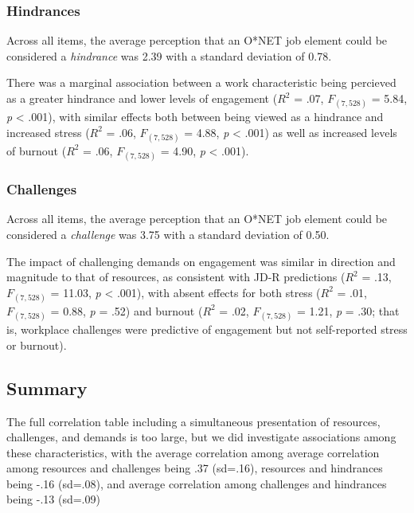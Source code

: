 \documentclass[
  english,
  man]{apa6}
\begin{document}
\hypertarget{hindrances}{%
\subsubsection{Hindrances}\label{hindrances}}

Across all items, the average perception that an O*NET job element could be considered a \emph{hindrance} was 2.39 with a standard deviation of 0.78.

There was a marginal association between a work characteristic being percieved as a greater hindrance and lower levels of engagement (\(R^2\) = .07, \(F_(7,528)\) = 5.84, \emph{p} \textless{} .001), with similar effects both between being viewed as a hindrance and increased stress (\(R^2\) = .06, \(F_(7,528)\) = 4.88, \emph{p} \textless{} .001) as well as increased levels of burnout (\(R^2\) = .06, \(F_(7,528)\) = 4.90, \emph{p} \textless{} .001).

\hypertarget{challenges}{%
\subsubsection{Challenges}\label{challenges}}

Across all items, the average perception that an O*NET job element could be considered a \emph{challenge} was 3.75 with a standard deviation of 0.50.

The impact of challenging demands on engagement was similar in direction and magnitude to that of resources, as consistent with JD-R predictions (\(R^2\) = .13, \(F_(7,528)\) = 11.03, \emph{p} \textless{} .001), with absent effects for both stress (\(R^2\) = .01, \(F_(7,528)\) = 0.88, \emph{p} = .52) and burnout (\(R^2\) = .02, \(F_(7,528)\) = 1.21, \emph{p} = .30; that is, workplace challenges were predictive of engagement but not self-reported stress or burnout).

\hypertarget{summary}{%
\subsection{Summary}\label{summary}}

The full correlation table including a simultaneous presentation of resources, challenges, and demands is too large, but we did investigate associations among these characteristics, with the average correlation among average correlation among resources and challenges being .37 (sd=.16), resources and hindrances being -.16 (sd=.08), and average correlation among challenges and hindrances being -.13 (sd=.09)
\end{document}
